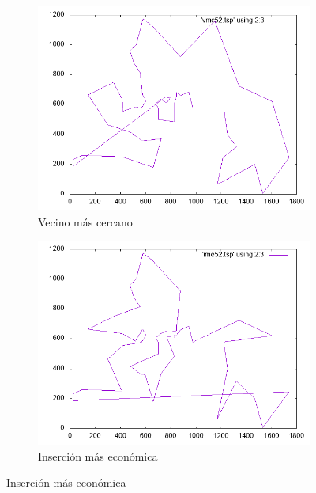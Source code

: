 \documentclass[12pt,spanish]{article}
\begin{document}
\begin{figure}[H]
\centering
\begin{subfigure}[b]{0.36\textwidth}
\includegraphics[width=\textwidth]{berlin52_vmc.png}
\caption{Vecino más cercano}
\end{subfigure}
\quad
\begin{subfigure}[b]{0.36\textwidth}
\includegraphics[width=\textwidth]{berlin52_ime.png}
\caption{Inserción más económica}
\end{subfigure}

\vspace{1cm}


\end{figure}
\end{document}
